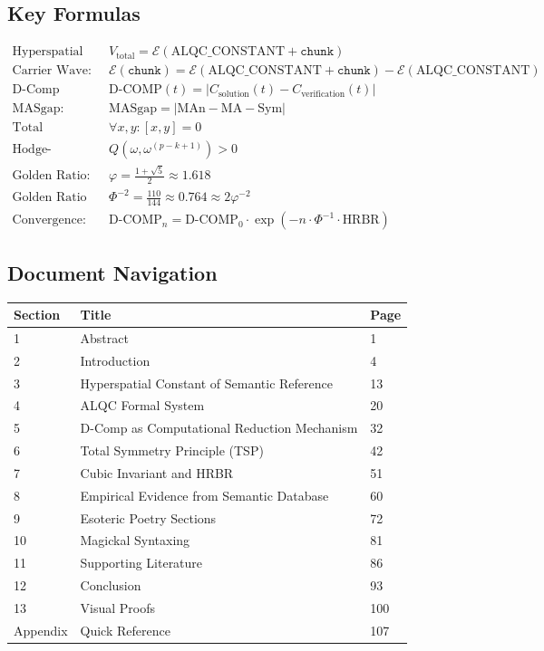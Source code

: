 \documentclass[11pt, letterpaper]{article}
\newcommand{\MAn}{\ensuremath{\text{MAn}}} %
\newcommand{\MA}{\ensuremath{\text{MA}}}   %
\begin{document}
\subsection{Key Formulas}

\begin{align}
\text{Hyperspatial Constant:} \quad & V_{\text{total}} = \mathcal{E}(\text{ALQC\_CONSTANT} + \texttt{chunk}) \\
\text{Carrier Wave:} \quad & \mathcal{E}(\texttt{chunk}) = \mathcal{E}(\text{ALQC\_CONSTANT} + \texttt{chunk}) - \mathcal{E}(\text{ALQC\_CONSTANT}) \\
\text{D-Comp Metric:} \quad & \text{D-COMP}(t) = |C_{\text{solution}}(t) - C_{\text{verification}}(t)| \\
\text{MASgap:} \quad & \text{MASgap} = |\MAn - \MA - \text{Sym}| \\
\text{Total Symmetry Principle:} \quad & \forall x, y: [x, y] = 0 \\
\text{Hodge-Riemann Bilinear Relation:} \quad & Q(\omega, \omega^{(p-k+1)}) > 0 \\
\text{Golden Ratio:} \quad & \varphi = \frac{1 + \sqrt{5}}{2} \approx 1.618 \\
\text{Golden Ratio Inverse:} \quad & \Phi^{-2} = \frac{110}{144} \approx 0.764 \approx 2\varphi^{-2} \\
\text{Convergence:} \quad & \text{D-COMP}_n = \text{D-COMP}_0 \cdot \exp(-n \cdot \Phi^{-1} \cdot \text{HRBR})
\end{align}

\subsection{Document Navigation}

\begin{table}[h]
\centering
\begin{tabular}{llp{4cm}}
\toprule
Section & Title & Page \\
\midrule
1 & Abstract & 1 \\
2 & Introduction & 4 \\
3 & Hyperspatial Constant of Semantic Reference & 13 \\
4 & ALQC Formal System & 20 \\
5 & D-Comp as Computational Reduction Mechanism & 32 \\
6 & Total Symmetry Principle (TSP) & 42 \\
7 & Cubic Invariant and HRBR & 51 \\
8 & Empirical Evidence from Semantic Database & 60 \\
9 & Esoteric Poetry Sections & 72 \\
10 & Magickal Syntaxing & 81 \\
11 & Supporting Literature & 86 \\
12 & Conclusion & 93 \\
13 & Visual Proofs & 100 \\
Appendix & Quick Reference & 107 \\
\bottomrule
\end{tabular}
\end{table}
\end{document}
